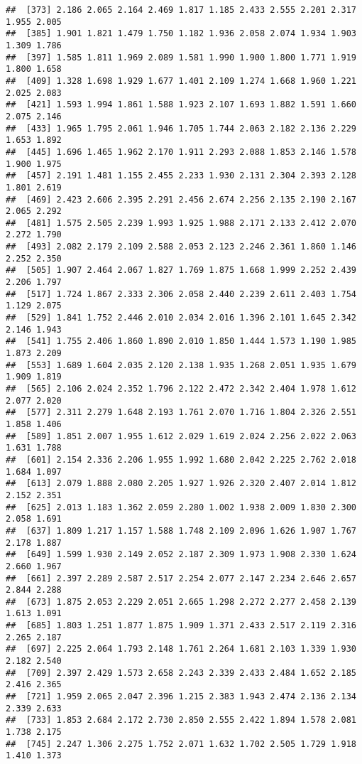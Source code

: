 \documentclass[
]{article}
\begin{document}
\begin{verbatim}
##  [373] 2.186 2.065 2.164 2.469 1.817 1.185 2.433 2.555 2.201 2.317 1.955 2.005
##  [385] 1.901 1.821 1.479 1.750 1.182 1.936 2.058 2.074 1.934 1.903 1.309 1.786
##  [397] 1.585 1.811 1.969 2.089 1.581 1.990 1.900 1.800 1.771 1.919 1.800 1.658
##  [409] 1.328 1.698 1.929 1.677 1.401 2.109 1.274 1.668 1.960 1.221 2.025 2.083
##  [421] 1.593 1.994 1.861 1.588 1.923 2.107 1.693 1.882 1.591 1.660 2.075 2.146
##  [433] 1.965 1.795 2.061 1.946 1.705 1.744 2.063 2.182 2.136 2.229 1.653 1.892
##  [445] 1.696 1.465 1.962 2.170 1.911 2.293 2.088 1.853 2.146 1.578 1.900 1.975
##  [457] 2.191 1.481 1.155 2.455 2.233 1.930 2.131 2.304 2.393 2.128 1.801 2.619
##  [469] 2.423 2.606 2.395 2.291 2.456 2.674 2.256 2.135 2.190 2.167 2.065 2.292
##  [481] 1.575 2.505 2.239 1.993 1.925 1.988 2.171 2.133 2.412 2.070 2.272 1.790
##  [493] 2.082 2.179 2.109 2.588 2.053 2.123 2.246 2.361 1.860 1.146 2.252 2.350
##  [505] 1.907 2.464 2.067 1.827 1.769 1.875 1.668 1.999 2.252 2.439 2.206 1.797
##  [517] 1.724 1.867 2.333 2.306 2.058 2.440 2.239 2.611 2.403 1.754 1.129 2.075
##  [529] 1.841 1.752 2.446 2.010 2.034 2.016 1.396 2.101 1.645 2.342 2.146 1.943
##  [541] 1.755 2.406 1.860 1.890 2.010 1.850 1.444 1.573 1.190 1.985 1.873 2.209
##  [553] 1.689 1.604 2.035 2.120 2.138 1.935 1.268 2.051 1.935 1.679 1.909 1.819
##  [565] 2.106 2.024 2.352 1.796 2.122 2.472 2.342 2.404 1.978 1.612 2.077 2.020
##  [577] 2.311 2.279 1.648 2.193 1.761 2.070 1.716 1.804 2.326 2.551 1.858 1.406
##  [589] 1.851 2.007 1.955 1.612 2.029 1.619 2.024 2.256 2.022 2.063 1.631 1.788
##  [601] 2.154 2.336 2.206 1.955 1.992 1.680 2.042 2.225 2.762 2.018 1.684 1.097
##  [613] 2.079 1.888 2.080 2.205 1.927 1.926 2.320 2.407 2.014 1.812 2.152 2.351
##  [625] 2.013 1.183 1.362 2.059 2.280 1.002 1.938 2.009 1.830 2.300 2.058 1.691
##  [637] 1.809 1.217 1.157 1.588 1.748 2.109 2.096 1.626 1.907 1.767 2.178 1.887
##  [649] 1.599 1.930 2.149 2.052 2.187 2.309 1.973 1.908 2.330 1.624 2.660 1.967
##  [661] 2.397 2.289 2.587 2.517 2.254 2.077 2.147 2.234 2.646 2.657 2.844 2.288
##  [673] 1.875 2.053 2.229 2.051 2.665 1.298 2.272 2.277 2.458 2.139 1.613 1.091
##  [685] 1.803 1.251 1.877 1.875 1.909 1.371 2.433 2.517 2.119 2.316 2.265 2.187
##  [697] 2.225 2.064 1.793 2.148 1.761 2.264 1.681 2.103 1.339 1.930 2.182 2.540
##  [709] 2.397 2.429 1.573 2.658 2.243 2.339 2.433 2.484 1.652 2.185 2.416 2.365
##  [721] 1.959 2.065 2.047 2.396 1.215 2.383 1.943 2.474 2.136 2.134 2.339 2.633
##  [733] 1.853 2.684 2.172 2.730 2.850 2.555 2.422 1.894 1.578 2.081 1.738 2.175
##  [745] 2.247 1.306 2.275 1.752 2.071 1.632 1.702 2.505 1.729 1.918 1.410 1.373

\end{verbatim}
\end{document}
